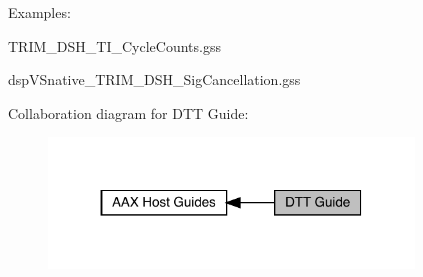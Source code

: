 Examples\+: 
\begin{DoxyItemize}
\item T\+R\+I\+M\+\_\+\+D\+S\+H\+\_\+\+T\+I\+\_\+\+Cycle\+Counts.\+gss 
\item dsp\+V\+Snative\+\_\+\+T\+R\+I\+M\+\_\+\+D\+S\+H\+\_\+\+Sig\+Cancellation.\+gss 
\end{DoxyItemize}

 Collaboration diagram for D\+TT Guide\+:
\nopagebreak
\begin{figure}[H]
\begin{center}
\leavevmode
\includegraphics[width=275pt]{a00836}
\end{center}
\end{figure}
